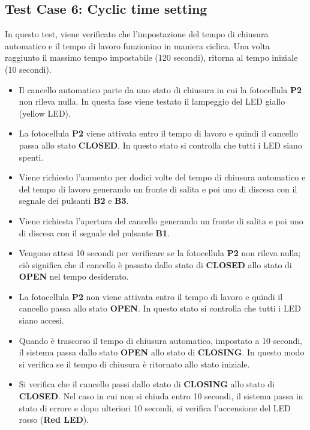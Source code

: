 \documentclass[12pt]{article}
\begin{document}
\newpage
\subsection{Test Case 6: Cyclic time setting}
In questo test, viene verificato che l'impostazione del tempo di chiusura automatico e il tempo di lavoro funzionino in maniera ciclica. Una volta raggiunto il massimo tempo impostabile (120 secondi), ritorna al tempo iniziale (10 secondi).

\begin{itemize}

    \item Il cancello automatico parte da uno stato di chiusura in cui la fotocellula \textbf{P2} non rileva nulla. In questa fase viene testato il lampeggio del LED giallo (yellow LED).
    \item La fotocellula \textbf{P2} viene attivata entro il tempo di lavoro e quindi il cancello passa allo stato \textbf{CLOSED}. In questo stato si controlla che tutti i LED siano spenti.
    \item Viene richiesto l'aumento per dodici volte del tempo di chiusura automatico e del tempo di lavoro generando un fronte di salita e poi uno di discesa con il segnale dei pulsanti \textbf{B2} e \textbf{B3}.
    \item Viene richiesta l’apertura del cancello generando un fronte di salita e poi uno di discesa con il segnale del pulsante \textbf{B1}.
    \item Vengono attesi 10 secondi per verificare se la fotocellula \textbf{P2} non rileva nulla; ciò significa che il cancello è passato dallo stato di \textbf{CLOSED} allo stato di \textbf{OPEN} nel tempo desiderato.
    \item La fotocellula \textbf{P2} non viene attivata entro il tempo di lavoro e quindi il cancello passa allo stato \textbf{OPEN}. In questo stato si controlla che tutti i LED siano accesi.
    \item Quando è trascorso il tempo di chiusura automatico, impostato a 10 secondi, il sistema passa dallo stato \textbf{OPEN} allo stato di \textbf{CLOSING}. In questo modo si verifica se il tempo di chiusura è ritornato allo stato iniziale.
    \item Si verifica che il cancello passi dallo stato di \textbf{CLOSING} allo stato di \textbf{CLOSED}. Nel caso in cui non si chiuda entro 10 secondi, il sistema passa in stato di errore e dopo ulteriori 10 secondi, si verifica l'accensione del LED rosso (\textbf{Red LED}).

\end{itemize}
\end{document}
